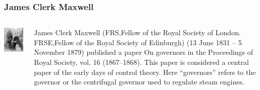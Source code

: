 \documentclass{beamer}
\begin{document}
\begin{frame}
\frametitle{James Clerk Maxwell}
\label{sec-2-3}
\begin{columns}
\begin{column}{0.3\textwidth}
\label{sec-2-3-1}

\includegraphics[width=.9\linewidth]{image/Maxwell.jpg}
\end{column}
\begin{column}{0.7\textwidth}
\label{sec-2-3-2}

   James Clerk Maxwell (FRS,Fellow of the Royal Society of London. FRSE,Fellow of the Royal Society of Edinburgh)  (13 June 1831 – 5 November 1879) published a paper On governors in the Proceedings of Royal Society, vol. 16 (1867–1868). This paper is considered a central paper of the early days of control theory. Here ``governors'' refers to the governor or the centrifugal governor used to regulate steam engines.
\end{column}
\end{columns}
\end{frame}
\end{document}
